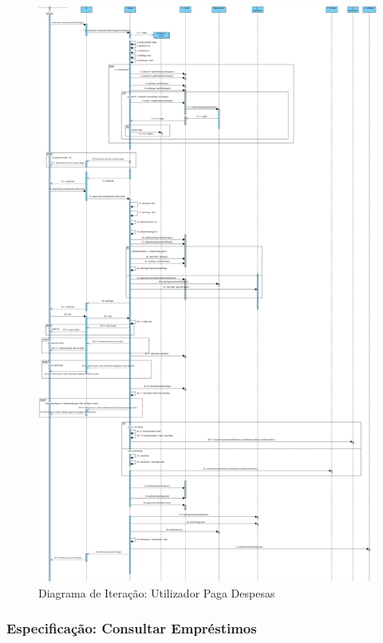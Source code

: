 \begin{figure}[htb!]
	\centering
	\includegraphics[scale=0.18]{imagens/DiagramaIt/UtilizadorPagaFactura}  
	\caption{Diagrama de Iteração: Utilizador Paga Despesas}  
\end{figure}

\newpage \clearpage

\subsubsection{Especificação: Consultar Empréstimos }

